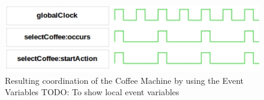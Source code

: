 \begin{itemize}
	
	 \begin{figure}[h]
		\center
		\includegraphics[width=.5\textwidth]{bcool/figs/runningeventvar}
		\caption{Resulting coordination of the Coffee Machine by using the Event Variables TODO: To show local event variables}
		\label{fig:runningeventvar}
	\end{figure}
	

\end{itemize}




